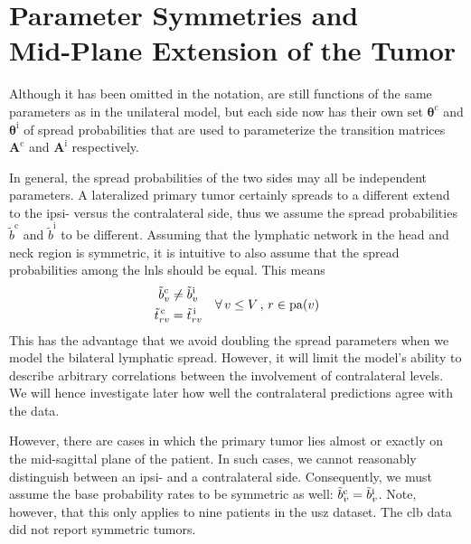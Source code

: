 \documentclass[\relativeRoot/main.tex]{subfiles}
\begin{document}
\section[Symmetries and Mid-Plane Extension]{Parameter Symmetries and\\Mid-Plane Extension of the Tumor}
\label{sec:bilateral:parameter_symmetries}

Although it has been omitted in the notation,  are still functions of the same parameters as in the unilateral model, but each side now has their own set $\boldsymbol{\theta}^\text{c}$ and $\boldsymbol{\theta}^\text{i}$ of spread probabilities that are used to parameterize the transition matrices $\mathbf{A}^\text{c}$ and $\mathbf{A}^\text{i}$ respectively.

In general, the spread probabilities of the two sides may all be independent parameters. A lateralized primary tumor certainly spreads to a different extend to the ipsi- versus the contralateral side, thus we assume the spread probabilities $\tilde{b}^\text{c}$ and $\tilde{b}^\text{i}$ to be different. Assuming that the lymphatic network in the head and neck region is symmetric, it is intuitive to also assume that the spread probabilities among the \glspl{lnl} should be equal. This means
%
\begin{equation}
    \begin{aligned}
        \Tilde{b}^\text{c}_v &\neq \Tilde{b}^\text{i}_v \\
        \Tilde{t}^\text{\,c}_{rv} &= \Tilde{t}^\text{\,i}_{rv}
    \end{aligned}
    \quad \forall \, v \leq V \, , \, r \in \operatorname{pa}(v)
\end{equation}
%
This has the advantage that we avoid doubling the spread parameters when we model the bilateral lymphatic spread. However, it will limit the model's ability to describe arbitrary correlations between the involvement of contralateral levels. We will hence investigate later how well the contralateral predictions agree with the data.

However, there are cases in which the primary tumor lies almost or exactly on the mid-sagittal plane of the patient. In such cases, we cannot reasonably distinguish between an ipsi- and a contralateral side. Consequently, we must assume the base probability rates to be symmetric as well: $\Tilde{b}^\text{c}_v = \Tilde{b}^\text{i}_v$. Note, however, that this only applies to nine patients in the \gls{usz} dataset. The \gls{clb} data did not report symmetric tumors.
\end{document}
